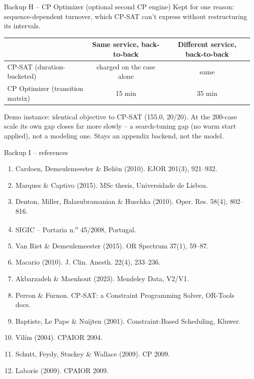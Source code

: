 \documentclass[aspectratio=169]{beamer}
\newcommand{\backbutton}{%
  \hfill\hyperlink{toc}{\beamerreturnbutton{Agenda}}%
}
\begin{document}
\begin{frame}{Backup H -- CP Optimizer (optional second CP engine)}
  Kept for one reason: sequence-dependent turnover, which CP-SAT can't
  express without restructuring its intervals.
  \begin{center}
  \footnotesize
  \begin{tabular}{lcc}
    \toprule
    & Same service, back-to-back & Different service, back-to-back \\
    \midrule
    CP-SAT (duration-bucketed) & charged on the case alone & same \\
    CP Optimizer (transition matrix) & 15 min & 35 min \\
    \bottomrule
  \end{tabular}
  \end{center}
  \vspace{0.5em}
  Demo instance: identical objective to CP-SAT (155.0, 20/20). At the
  200-case scale its own gap closes far more slowly -- a search-tuning
  gap (no warm start applied), not a modeling one. Stays an appendix
  backend, not the model.
  \backbutton
\end{frame}

\begin{frame}{Backup I -- references}
  \tiny
  \begin{enumerate}
    \item Cardoen, Demeulemeester \& Beli\"en (2010). EJOR 201(3), 921--932.
    \item Marques \& Captivo (2015). MSc thesis, Universidade de Lisboa.
    \item Denton, Miller, Balasubramanian \& Huschka (2010). Oper. Res. 58(4), 802--816.
    \item SIGIC -- Portaria n.\textsuperscript{o} 45/2008, Portugal.
    \item Van Riet \& Demeulemeester (2015). OR Spectrum 37(1), 59--87.
    \item Macario (2010). J. Clin. Anesth. 22(4), 233--236.
    \item Akbarzadeh \& Maenhout (2023). Mendeley Data, V2/V1.
    \item Perron \& Furnon. CP-SAT: a Constraint Programming Solver, OR-Tools docs.
    \item Baptiste, Le Pape \& Nuijten (2001). Constraint-Based Scheduling, Kluwer.
    \item Vil\'im (2004). CPAIOR 2004.
    \item Schutt, Feydy, Stuckey \& Wallace (2009). CP 2009.
    \item Laborie (2009). CPAIOR 2009.
  \end{enumerate}
  \backbutton
\end{frame}
\end{document}
